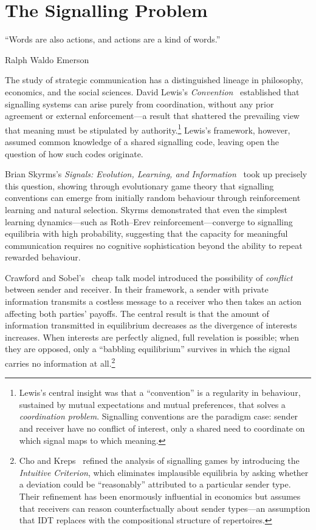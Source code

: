 
\chapter{The Signalling Problem}
\label{ch:signalling}

\epigraph{``Words are also actions, and actions are a kind of words.''}{Ralph Waldo Emerson}


The study of strategic communication has a distinguished lineage in
philosophy, economics, and the social sciences.  David Lewis's
\emph{Convention}~\cite{lewis1969} established that signalling systems
can arise purely from coordination, without any prior agreement or
external enforcement---a result that shattered the prevailing view that
meaning must be stipulated by authority.\footnote{Lewis's central
insight was that a ``convention'' is a regularity in behaviour, sustained
by mutual expectations and mutual preferences, that solves a
\emph{coordination problem}.  Signalling conventions are the paradigm
case: sender and receiver have no conflict of interest, only a shared
need to coordinate on which signal maps to which meaning.}  Lewis's
framework, however, assumed common knowledge of a shared signalling
code, leaving open the question of how such codes originate.

Brian Skyrms's \emph{Signals: Evolution, Learning, and
Information}~\cite{skyrms2010} took up precisely this question, showing
through evolutionary game theory that signalling conventions can emerge
from initially random behaviour through reinforcement learning and
natural selection.  Skyrms demonstrated that even the simplest learning
dynamics---such as Roth--Erev reinforcement---converge to signalling
equilibria with high probability, suggesting that the capacity for
meaningful communication requires no cognitive sophistication beyond the
ability to repeat rewarded behaviour.

Crawford and Sobel's~\cite{crawford1982} cheap talk model introduced
the possibility of \emph{conflict} between sender and receiver.  In
their framework, a sender with private information transmits a
costless message to a receiver who then takes an action affecting
both parties' payoffs.  The central result is that the amount of
information transmitted in equilibrium decreases as the divergence
of interests increases.  When interests are perfectly aligned, full
revelation is possible; when they are opposed, only a ``babbling
equilibrium'' survives in which the signal carries no information
at all.\footnote{Cho and Kreps~\cite{cho1987} refined the analysis
of signalling games by introducing the \emph{Intuitive Criterion},
which eliminates implausible equilibria by asking whether a deviation
could be ``reasonably'' attributed to a particular sender type.
Their refinement has been enormously influential in economics but
assumes that receivers can reason counterfactually about sender
types---an assumption that IDT replaces with the compositional
structure of repertoires.}

